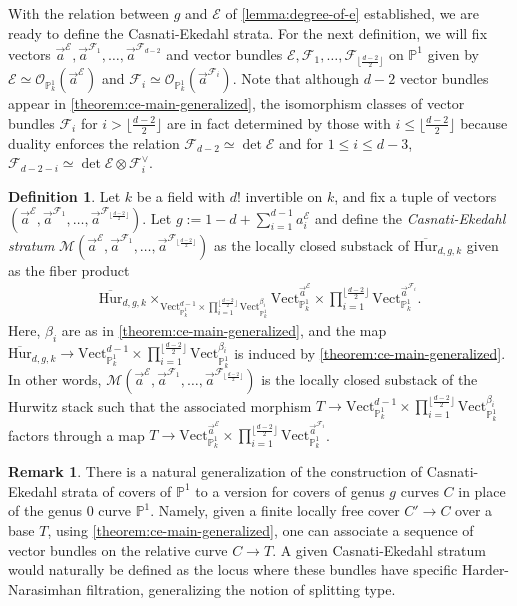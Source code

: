 \documentclass[12 pt]{amsart}
\newcommand{\rboxed}[1]{#1}
\theoremstyle{plain}
\theoremstyle{definition}
\newtheorem{definition}[theorem]{Definition}
\newtheorem{remark}[theorem]{Remark}
\theoremstyle{remark}
\numberwithin{equation}{section}
\newcommand\bp{\mathbb P}
\newcommand\sce{\mathscr E}
\newcommand\scf{\mathscr F}
\newcommand\sco{\mathscr O}
\newcommand \ra{\rightarrow}
\newcommand\vect[2]{\mathrm{Vect}^{#1}_{#2}} %
\newcommand\vecthn[2]{\mathrm{Vect}^{#1}_{#2}} %
\newcommand\bighurg[3]{\overline{\mathrm{Hur}}_{#1,#2, #3}} %
\newcommand\ce{\mathscr M} %
\begin{document}
With the relation between $g$ and $\sce$ of \autoref{lemma:degree-of-e}
established, we are ready to define the Casnati-Ekedahl strata.
For the next definition, we will fix 
vectors 
$\vec{a}^\sce, \vec{a}^{\scf_1}, \ldots, \vec{a}^{\scf_{d-2}}$
and 
vector bundles $\sce, \scf_1, \ldots,
\scf_{\lfloor \frac{d-2}{2} \rfloor}$ on $\bp^1$
given by $\sce \simeq \sco_{\bp^1_k}(\vec{a}^\sce)$ and
$\scf_i \simeq \sco_{\bp^1_k}(\vec{a}^{\scf_i})$.
Note that although $d-2$ vector bundles appear in \autoref{theorem:ce-main-generalized},
the isomorphism classes of vector bundles $\scf_i$ for $i > \lfloor \frac{d-2}{2} \rfloor$ are in fact
determined by those with $i \leq \lfloor \frac{d-2}{2} \rfloor$
because duality enforces the relation $\scf_{d-2} \simeq \det \sce$ and
for $1 \leq i \leq d-3$,
$\scf_{d-2-i} \simeq \det \sce \otimes \scf_i^\vee$.

\begin{definition} \label{definition:ce-locus} 
	Let $k$ be a field with $d!$ invertible on $k$, 
	and fix a tuple of vectors	
	$(\vec a^\sce, \vec a^{\scf_1} , \ldots, \vec a^{\scf_{\lfloor \frac{d-2}{2} \rfloor}})$.
	Let
	$\rboxed{g} := 1 - d + \sum_{i=1}^{d-1} a_i^{\sce}$ and define the
	{\em Casnati-Ekedahl stratum} $\ce(\vec a^\sce, \vec a^{\scf_1} , \ldots, \vec
	a^{\scf_{\lfloor \frac{d-2}{2} \rfloor}} )$ as the locally closed
	substack of $\bighurg d g k$ given as the fiber product \begin{align*}
		\bighurg
		d g k \times_{\vect {d-1} {\bp^1_k} \times \prod_{i=1}^{\lfloor \frac{d-2}{2} \rfloor}
		\vect {\beta_i} {\bp^1_k}} \vecthn {\vec a^\sce } {\bp^1_k}
		\times \prod_{i=1}^{\lfloor \frac{d-2}{2} \rfloor} \vecthn {\vec a^{\scf_i}} {\bp^1_k}.
	\end{align*} 
	Here, $\beta_i$ are as in
	\autoref{theorem:ce-main-generalized}, and the map $\bighurg d g k \to \vect
	{d-1} {\bp^1_k} \times \prod_{i=1}^{\lfloor \frac{d-2}{2} \rfloor} \vect {\beta_i} {\bp^1_k}$ is
	induced by \autoref{theorem:ce-main-generalized}.  In other words,
	$\ce(\vec a^\sce, \vec a^{\scf_1} , \ldots, \vec a^{\scf_{\lfloor \frac{d-2}{2} \rfloor}} )$ is
	the locally closed substack of the Hurwitz stack such that the
	associated morphism $T \ra \vect {d-1} {\bp^1_k} \times
\prod_{i=1}^{\lfloor \frac{d-2}{2} \rfloor} \vect {\beta_i} {\bp^1_k}$ factors through a map $T \ra
\vecthn {\vec a^\sce } {\bp^1_k} \times \prod_{i=1}^{\lfloor \frac{d-2}{2} \rfloor} \vecthn {\vec
a^{\scf_i}} {\bp^1_k}$.  \end{definition} 

\begin{remark} \label{remark:} There is a natural generalization of the
	construction of Casnati-Ekedahl strata of covers of $\bp^1$ 
	to a version for covers of genus $g$ curves $C$ in place of the genus
	$0$ curve $\bp^1$.
	Namely, 
	given a finite locally free cover $C' \to C$ over a base $T$,	
	using \autoref{theorem:ce-main-generalized},
	one can associate 
	a sequence of vector bundles 
	on the relative curve $C \ra T$.
	A given Casnati-Ekedahl stratum would
naturally be defined as the locus where these bundles have specific
Harder-Narasimhan filtration, generalizing the notion of splitting type.
\end{remark}
\end{document}
